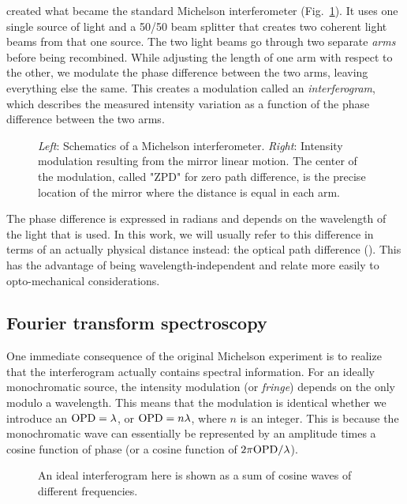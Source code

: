 \citet{Michelson:1887wc} created what became the standard Michelson interferometer (Fig.~\ref{fig:michelson}). It uses one single source of light and a 50/50 beam splitter that creates two coherent light beams from that one source. The two light beams go through two separate \textit{arms} before being recombined. While adjusting the length of one arm with respect to the other, we modulate the phase difference between the two arms, leaving everything else the same. This creates a modulation called an \textit{interferogram}, which describes the measured intensity variation as a function of the phase difference between the two arms.

\begin{figure}[!h]
\centering

\caption[Michelson interferometer]{\textit{Left}: Schematics of a Michelson interferometer. \textit{Right}: Intensity modulation resulting from the mirror linear motion. The center of the modulation, called "ZPD" for zero path difference, is the precise location of the mirror where the distance is equal in each arm.}
\label{fig:michelson}
\end{figure}


The phase difference is expressed in radians and depends on the wavelength of the light that is used. In this work, we will usually refer to this difference in terms of an actually physical distance instead: the optical path difference (\OPD). This has the advantage of being wavelength-independent and relate more easily to opto-mechanical considerations.




\subsection{Fourier transform spectroscopy}

One immediate consequence of the original Michelson experiment is to realize that the interferogram actually contains spectral information. For an ideally monochromatic source, the intensity modulation (or \textit{fringe}) depends on the \OPD only modulo a wavelength. This means that the modulation is identical whether we introduce an $\textrm{OPD} = \lambda$, or $\textrm{OPD} = n\lambda$, where $n$ is an integer. This is because the monochromatic wave can essentially be represented by an amplitude times a cosine function of phase (or a cosine function of $2\pi\textrm{OPD}/\lambda$).

\begin{figure}[!ht]
	\centering
	
	\caption[Simple interferogram]{An ideal interferogram here is shown as a sum of cosine waves of different frequencies.}
	\label{fig:interferogram}
    \end{figure}


